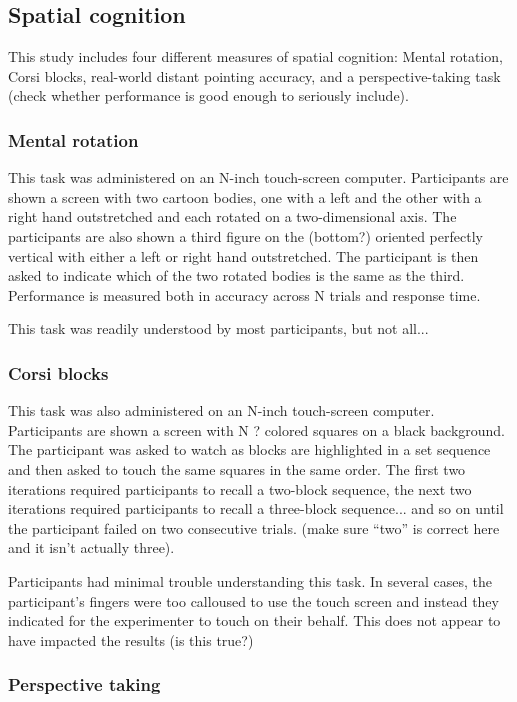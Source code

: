 	\subsection{Spatial cognition}
	\label{sec:2.2}
This study includes four different measures of spatial cognition: Mental rotation, Corsi blocks, real-world distant pointing accuracy, and a perspective-taking task (check whether performance is good enough to seriously include).

		\subsubsection{Mental rotation}
		\label{sec:2.2.1}		
This task was administered on an N-inch touch-screen computer.  Participants are shown a screen with two cartoon bodies, one with a left and the other with a right hand outstretched and each rotated on a two-dimensional axis.  The participants are also shown a third figure on the (bottom?) oriented perfectly vertical with either a left or right hand outstretched.  The participant is then asked to indicate which of the two rotated bodies is the same as the third.  Performance is measured both in accuracy across N trials and response time.

This task was readily understood by most participants, but not all...		
	
		\subsubsection{Corsi blocks}
		\label{sec:2.2.2}
This task was also administered on an N-inch touch-screen computer.  Participants are shown a screen with N ? colored squares on a black background.  The participant was asked to watch as blocks are highlighted in a set sequence and then asked to touch the same squares in the same order.  The first two iterations required participants to recall a two-block sequence, the next two iterations required participants to recall a three-block sequence... and so on until the participant failed on two consecutive trials. (make sure ``two'' is correct here and it isn't actually three).

Participants had minimal trouble understanding this task.  In several cases, the participant's fingers were too calloused to use the touch screen and instead they indicated for the experimenter to touch on their behalf.  This does not appear to have impacted the results (is this true?)    

		\subsubsection{Perspective taking}
		\label{sec:2.2.3}					
		
